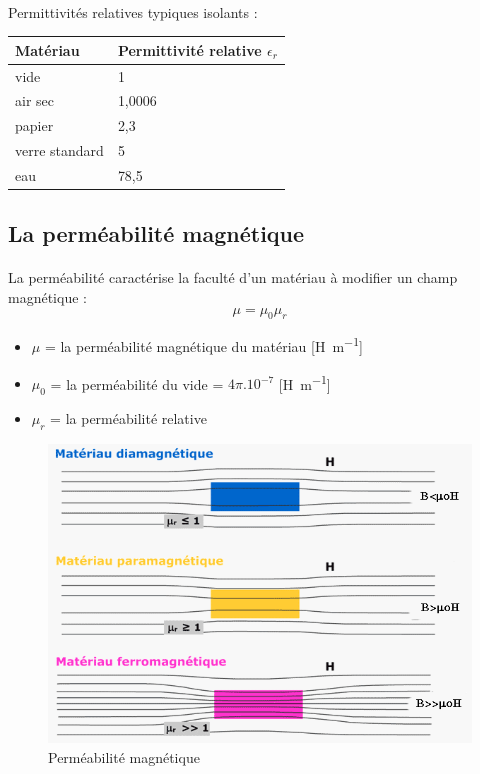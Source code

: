 \documentclass{article}
\begin{document}
\paragraph{}
Permittivités relatives typiques isolants :
\begin{table}[H]
    \centering
    \begin{tabular}{l l}
        \textbf{Matériau} & \textbf{Permittivité relative $\epsilon_r$}\\
        \hline
        vide & 1\\
        air sec & 1,0006\\
        papier & 2,3\\
        verre standard & 5\\
        eau & 78,5\\
    \end{tabular}
\end{table}

\subsection{La perméabilité magnétique}
\paragraph{}
La perméabilité caractérise la faculté d'un matériau à modifier un champ magnétique :
$$\mu = \mu_0 \mu_r$$

\begin{itemize}
    \item $\mu$ = la perméabilité magnétique du matériau [\si{\henry\per\meter}]
    \item $\mu_0$ = la perméabilité du vide = $4\pi.10^{-7}$ [\si{\henry\per\meter}]
    \item $\mu_r$ = la perméabilité relative
\end{itemize}

\begin{figure}[H]
    \centering
    \includegraphics[width=0.7\linewidth]{./images/permeabilite_magnetique_m.png}
    \caption{Perméabilité magnétique}
\end{figure}
\end{document}
